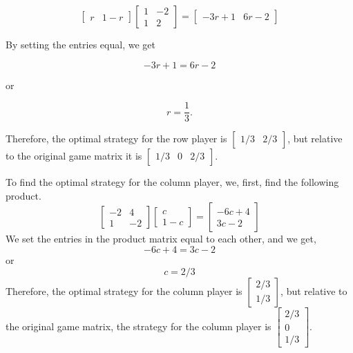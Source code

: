 \begin{solution}
    \[ \begin{bmatrix} r & 1-r \end{bmatrix}
        \begin{bmatrix} 1 & -2 \\ 1 & 2 \end{bmatrix} =
        \begin{bmatrix} -3r + 1 & 6r - 2 \end{bmatrix} \]

    By setting the entries equal, we get

    \[ -3r + 1 = 6r - 2 \]

    or

    \[ r = \frac{1}{3}. \]

    Therefore, the optimal strategy for the row player is \( \begin{bmatrix} 1/3 & 2/3 \end{bmatrix} \), but relative to the original game matrix it is \( \begin{bmatrix} 1/3 & 0 & 2/3 \end{bmatrix} \).

    To find the optimal strategy for the column player, we, first, find the following product.
    \[
        \begin{bmatrix}
            -2 & 4  \\
            1  & -2
        \end{bmatrix}
        \begin{bmatrix}
            c \\
            1 - c
        \end{bmatrix} =
        \begin{bmatrix}
            -6c + 4 \\
            3c - 2
        \end{bmatrix}
    \]
    We set the entries in the product matrix equal to each other, and we get,
    \[
        -6c + 4 = 3c - 2
    \]
    or
    \[
        c = 2/3
    \]
    Therefore, the optimal strategy for the column player is \( \begin{bmatrix} 2/3 \\ 1/3 \end{bmatrix} \), but relative to the original game matrix, the strategy for the column player is \( \begin{bmatrix} 2/3 \\ 0 \\ 1/3 \end{bmatrix} \).


\end{solution}
